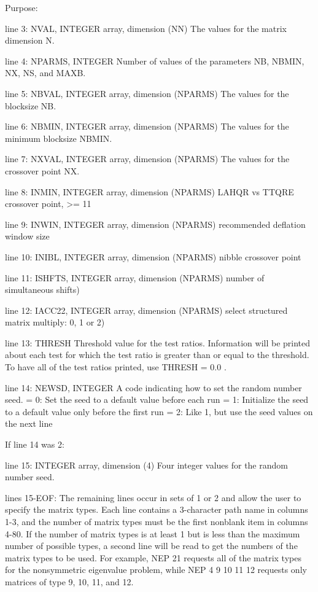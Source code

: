 \begin{DoxyParagraph}{Purpose\+: }
\begin{DoxyVerb}
 line 3:  NVAL, INTEGER array, dimension (NN)
          The values for the matrix dimension N.

 line 4:  NPARMS, INTEGER
          Number of values of the parameters NB, NBMIN, NX, NS, and
          MAXB.

 line 5:  NBVAL, INTEGER array, dimension (NPARMS)
          The values for the blocksize NB.

 line 6:  NBMIN, INTEGER array, dimension (NPARMS)
          The values for the minimum blocksize NBMIN.

 line 7:  NXVAL, INTEGER array, dimension (NPARMS)
          The values for the crossover point NX.

 line 8:  INMIN, INTEGER array, dimension (NPARMS)
          LAHQR vs TTQRE crossover point, >= 11

 line 9:  INWIN, INTEGER array, dimension (NPARMS)
          recommended deflation window size

 line 10: INIBL, INTEGER array, dimension (NPARMS)
          nibble crossover point

 line 11:  ISHFTS, INTEGER array, dimension (NPARMS)
          number of simultaneous shifts)

 line 12:  IACC22, INTEGER array, dimension (NPARMS)
          select structured matrix multiply: 0, 1 or 2)

 line 13: THRESH
          Threshold value for the test ratios.  Information will be
          printed about each test for which the test ratio is greater
          than or equal to the threshold.  To have all of the test
          ratios printed, use THRESH = 0.0 .

 line 14: NEWSD, INTEGER
          A code indicating how to set the random number seed.
          = 0:  Set the seed to a default value before each run
          = 1:  Initialize the seed to a default value only before the
                first run
          = 2:  Like 1, but use the seed values on the next line

 If line 14 was 2:

 line 15: INTEGER array, dimension (4)
          Four integer values for the random number seed.

 lines 15-EOF:  The remaining lines occur in sets of 1 or 2 and allow
          the user to specify the matrix types.  Each line contains
          a 3-character path name in columns 1-3, and the number
          of matrix types must be the first nonblank item in columns
          4-80.  If the number of matrix types is at least 1 but is
          less than the maximum number of possible types, a second
          line will be read to get the numbers of the matrix types to
          be used.  For example,
 NEP 21
          requests all of the matrix types for the nonsymmetric
          eigenvalue problem, while
 NEP  4
 9 10 11 12
          requests only matrices of type 9, 10, 11, and 12.


\end{DoxyVerb}
\end{DoxyParagraph}
